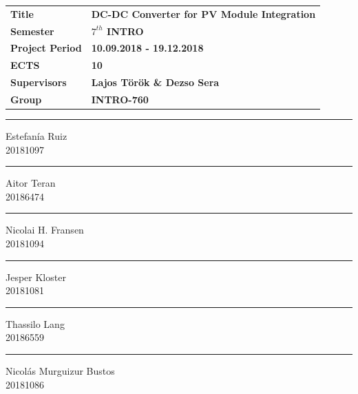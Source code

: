 \vspace*{1cm}
\begin{table}[H]
	\begin{tabular}{l l} 
		\textbf{Title} &  \textbf{DC-DC Converter for PV Module Integration} \\ 
		\textbf{Semester} & \textbf{$7^{th}$ INTRO}  \\ 
		\textbf{Project Period} & \textbf{10.09.2018 - 19.12.2018}  \\ 
		\textbf{ECTS} &  \textbf{10}\\ 
		\textbf{Supervisors} & \textbf{Lajos Török \& Dezso Sera}  \\ 
		\textbf{Group} & \textbf{INTRO-760}  \\ 
	\end{tabular}
\end{table}

\begin{center}	
	\vspace{40pt}
	\begin{minipage}{0.4\linewidth}
		\centering
		\hrule
		\vspace{12pt}
		Estefanía Ruiz\\ 
		20181097
	\end{minipage}
	\hspace{10pt}
	\vspace{40pt}
	\begin{minipage}{0.4\linewidth}
		\centering
		\hrule
		\vspace{12pt}
		Aitor Teran\\ 
		20186474	
	\end{minipage}
	\hspace{10pt}
	\vspace{40pt}
	\begin{minipage}{0.4\linewidth}
		\centering
		\hrule
		\vspace{12pt}
		Nicolai H. Fransen\\
		20181094
	\end{minipage}
	\hspace{10pt}
	\begin{minipage}{0.4\linewidth}
		\centering
		\hrule
		\vspace{12pt}
		Jesper Kloster\\
		20181081 
	\end{minipage}
	\hspace{10pt}
	\begin{minipage}{0.4\linewidth}
		\centering
		\hrule
		\vspace{12pt}
		Thassilo Lang\\ 
		20186559 
	\end{minipage}
	\hspace{10pt}
	\vspace{20pt}
	\begin{minipage}{0.4\linewidth}
		\centering
		\hrule
		\vspace{12pt}
		Nicolás Murguizur Bustos\\ 
		20181086
	\end{minipage}
\end{center}

